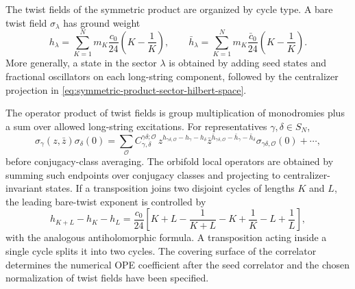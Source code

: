 The twist fields of the symmetric product are organized by cycle type.  A
bare twist field \(\sigma_\lambda\) has ground weight
\begin{equation}
  h_\lambda
  =
  \sum_{K=1}^N
  m_K\frac{c_0}{24}\left(K-\frac1K\right),
  \qquad
  \bar h_\lambda
  =
  \sum_{K=1}^N
  m_K\frac{\bar c_0}{24}\left(K-\frac1K\right).
  \label{eq:symmetric-product-cycle-type-weight}
\end{equation}
More generally, a state in the sector \(\lambda\) is obtained by adding seed
states and fractional oscillators on each long-string component, followed by
the centralizer projection in
\eqref{eq:symmetric-product-sector-hilbert-space}.

The operator product of twist fields is group multiplication of monodromies
plus a sum over allowed long-string excitations.  For representatives
\(\gamma,\delta\in S_N\),
\begin{equation}
  \sigma_\gamma(z,\bar z)\sigma_\delta(0)
  =
  \sum_{\mathcal O}
  C_{\gamma,\delta}^{\gamma\delta;\mathcal O}\,
  z^{h_{\gamma\delta,\mathcal O}-h_\gamma-h_\delta}
  \bar z^{\bar h_{\gamma\delta,\mathcal O}
  -\bar h_\gamma-\bar h_\delta}
  \sigma_{\gamma\delta,\mathcal O}(0)+\cdots ,
  \label{eq:symmetric-product-twist-ope}
\end{equation}
before conjugacy-class averaging.  The orbifold local operators are obtained
by summing such endpoints over conjugacy classes and projecting to
centralizer-invariant states.  If a transposition joins two disjoint cycles
of lengths \(K\) and \(L\), the leading bare-twist exponent is controlled by
\begin{equation}
  h_{K+L}-h_K-h_L
  =
  \frac{c_0}{24}
  \left[
    K+L-\frac1{K+L}
    -K+\frac1K
    -L+\frac1L
  \right],
  \label{eq:symmetric-product-join-weight-shift}
\end{equation}
with the analogous antiholomorphic formula.  A transposition acting inside a
single cycle splits it into two cycles.  The covering surface of the
correlator determines the numerical OPE coefficient after the seed
correlator and the chosen normalization of twist fields have been specified.

